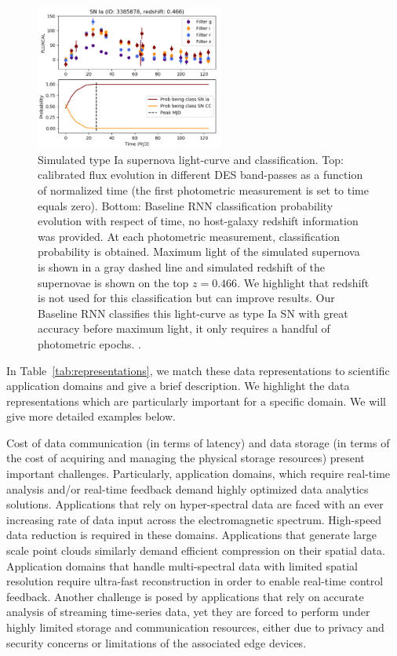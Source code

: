  \begin{figure}[tbh!]
     \centering
     \includegraphics[width = 0.55\textwidth]{figures/supernova_classification.png}
     \caption{Simulated type Ia supernova light-curve and classification. 
     Top: calibrated flux evolution in different DES band-passes as a function of normalized time (the first photometric measurement is set to time equals zero). Bottom: Baseline RNN classification probability evolution with respect of time, no host-galaxy redshift information was provided. 
     At each photometric measurement, classification probability is obtained. Maximum light of the simulated supernova is shown in a gray dashed line and simulated redshift of the supernovae is shown on the top $z = 0.466$. 
     We highlight that redshift is not used for this classification but can improve results. 
     Our Baseline RNN classifies this light-curve as type Ia SN with great accuracy before maximum light, it only requires a handful of photometric epochs. \cite{supernova_2019}.}
     \label{fig:supernova}
 \end{figure}
 
In Table~\ref{tab:representations}, we match these data representations to scientific application domains and give a brief description.  
We highlight the data representations which are particularly important for a specific domain.  
We will give more detailed examples below.  


Cost of data communication (in terms of latency) and data storage (in terms of the cost of acquiring and managing the physical storage resources) present important challenges. Particularly, application domains, which require real-time analysis and/or real-time feedback demand highly optimized data analytics solutions. 
Applications that rely on hyper-spectral data are faced with an ever increasing rate of data input across the electromagnetic spectrum. High-speed data reduction is required in these domains. 
Applications that generate large scale point clouds similarly demand efficient compression on their spatial data. 
Application domains that handle multi-spectral data with limited spatial resolution require ultra-fast reconstruction in order to enable real-time control feedback. Another challenge is posed by applications that rely on accurate analysis of streaming time-series data, yet they are forced to perform under highly limited storage and communication resources, either due to privacy and security concerns or limitations of the associated edge devices.  

